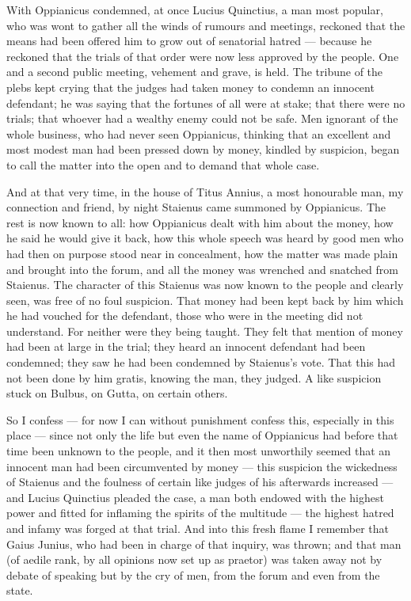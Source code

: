  With Oppianicus condemned, at once Lucius Quinctius, a man most popular, who was wont to gather all the winds of rumours and meetings, reckoned that the means had been offered him to grow out of senatorial hatred --- because he reckoned that the trials of that order were now less approved by the people. One and a second public meeting, vehement and grave, is held. The tribune of the plebs kept crying that the judges had taken money to condemn an innocent defendant; he was saying that the fortunes of all were at stake; that there were no trials; that whoever had a wealthy enemy could not be safe. Men ignorant of the whole business, who had never seen Oppianicus, thinking that an excellent and most modest man had been pressed down by money, kindled by suspicion, began to call the matter into the open and to demand that whole case.

 And at that very time, in the house of Titus Annius, a most honourable man, my connection and friend, by night Staienus came summoned by Oppianicus. The rest is now known to all: how Oppianicus dealt with him about the money, how he said he would give it back, how this whole speech was heard by good men who had then on purpose stood near in concealment, how the matter was made plain and brought into the forum, and all the money was wrenched and snatched from Staienus. The character of this Staienus was now known to the people and clearly seen, was free of no foul suspicion. That money had been kept back by him which he had vouched for the defendant, those who were in the meeting did not understand. For neither were they being taught. They felt that mention of money had been at large in the trial; they heard an innocent defendant had been condemned; they saw he had been condemned by Staienus's vote. That this had not been done by him gratis, knowing the man, they judged. A like suspicion stuck on Bulbus, on Gutta, on certain others.

 So I confess --- for now I can without punishment confess this, especially in this place --- since not only the life but even the name of Oppianicus had before that time been unknown to the people, and it then most unworthily seemed that an innocent man had been circumvented by money --- this suspicion the wickedness of Staienus and the foulness of certain like judges of his afterwards increased --- and Lucius Quinctius pleaded the case, a man both endowed with the highest power and fitted for inflaming the spirits of the multitude --- the highest hatred and infamy was forged at that trial. And into this fresh flame I remember that Gaius Junius, who had been in charge of that inquiry, was thrown; and that man (of aedile rank, by all opinions now set up as praetor) was taken away not by debate of speaking but by the cry of men, from the forum and even from the state.

